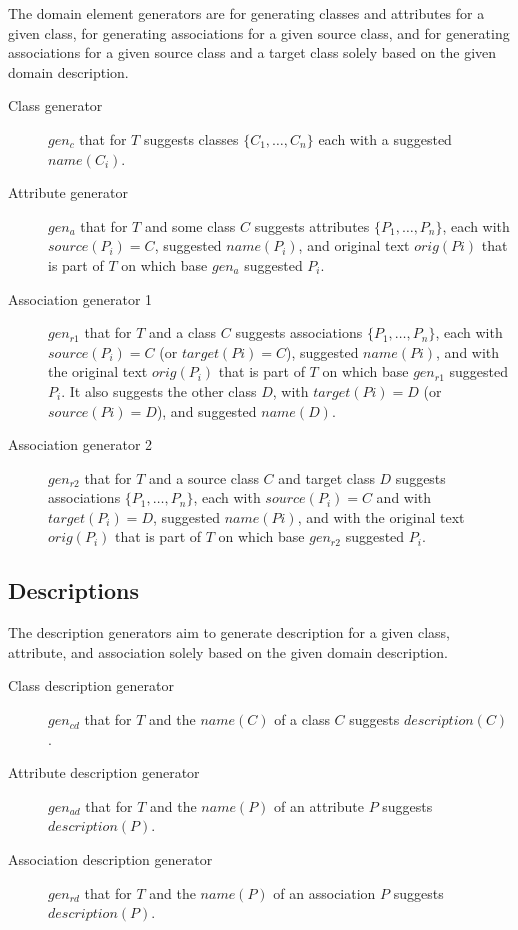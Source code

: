 The domain element generators are for generating classes and attributes for a given class, for generating associations for a given source class, and for generating associations for a given source class and a target class solely based on the given domain description.

\begin{description}
\item [Class generator] $gen_c$ that for $T$ suggests classes $\{C_1, \ldots, C_n\}$ each with a suggested $name(C_i)$.

\item [Attribute generator] $gen_a$ that for $T$ and some class $C$ suggests attributes $\{P_1, \ldots, P_n\}$, each with $source(P_i) = C$, suggested $name(P_i)$, and original text $orig(Pi)$ that is part of $T$ on which base $gen_a$ suggested $P_i$.

\item [Association generator 1] $gen_{r1}$ that for $T$ and a class $C$ suggests associations $\{P_1, \ldots, P_n\}$, each with $source(P_i) = C$ (or $target(Pi) = C$), suggested $name(Pi)$, and with the original text $orig(P_i)$ that is part of $T$ on which base $gen_{r1}$ suggested $P_i$. It also suggests the other class $D$, with $target(Pi)= D$ (or $source(Pi) = D$), and suggested $name(D)$.

\item [Association generator 2] $gen_{r2}$ that for $T$ and a source class $C$ and target class $D$ suggests associations $\{P_1, \ldots, P_n\}$, each with $source(P_i) = C$ and with $target(P_i) = D$, suggested $name(Pi)$, and with the original text $orig(P_i)$ that is part of $T$ on which base $gen_{r2}$ suggested $P_i$.
\end{description}


\subsection{Descriptions}

The description generators aim to generate description for a given class, attribute, and association solely based on the given domain description.

\begin{description}
\item [Class description generator] $gen_{cd}$ that for $T$ and the $name(C)$ of a class $C$ suggests $description(C)$.

\item [Attribute description generator] $gen_{ad}$ that for $T$ and the $name(P)$ of an attribute $P$ suggests $description(P)$.

\item [Association description generator] $gen_{rd}$ that for $T$ and the $name(P)$ of an association $P$ suggests $description(P)$.
\end{description}


